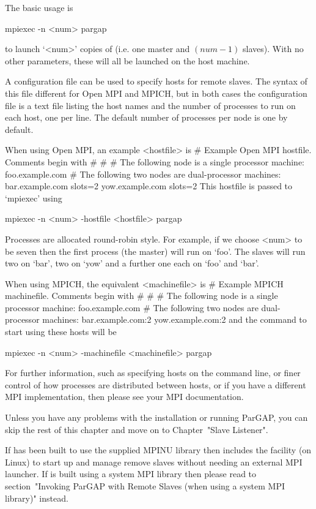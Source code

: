 The basic usage is

mpiexec -n <num> pargap

to launch `<num>' copies of {\ParGAP} (i.e. one master and $(num-1)$ slaves). 
With no other parameters, these will all be launched on the host machine.

A configuration file can be used to specify hosts for remote slaves. The
syntax of this file different for Open MPI and MPICH, but in both cases 
the configuration file is a text file listing the host names
and the number of processes to run on each host, one per line. The default 
number of processes per node is one by default.

When using Open MPI, an example <hostfile> is
\begintt
# Example Open MPI hostfile.  Comments begin with #
#
# The following node is a single processor machine:
foo.example.com
# The following two nodes are dual-processor machines:
bar.example.com slots=2
yow.example.com slots=2
\endtt
This hostfile is passed to `mpiexec' using

mpiexec -n <num> -hostfile <hostfile> pargap

Processes are allocated round-robin style. For example, if we choose <num> to
be seven then the first process (the master) will run on `foo'. The
slaves will run two on `bar', two on `yow' and a further one each on `foo' and
`bar'. 

When using MPICH, the equivalent <machinefile> is
\begintt
# Example MPICH machinefile.  Comments begin with #
#
# The following node is a single processor machine:
foo.example.com
# The following two nodes are dual-processor machines:
bar.example.com:2
yow.example.com:2
\endtt
and the command to start {\ParGAP} using these hosts will be 

mpiexec -n <num> -machinefile <machinefile> pargap

For further information, such as specifying hosts on the command line, or finer
control of how processes are distributed between hosts, or if you have a 
different MPI implementation, then please see your MPI documentation.

Unless you have any problems with the installation or running ParGAP,
you can skip the rest of this chapter and move on to Chapter~"Slave Listener".


If {\ParGAP} has been built to use the supplied MPINU library then
{\ParGAP} includes the facility (on Linux) to start up and manage 
remove slaves without needing an external MPI launcher. If {\ParGAP} is 
built using a system MPI library then please read to 
section~"Invoking ParGAP with Remote Slaves (when using a system MPI library)"
instead. 

